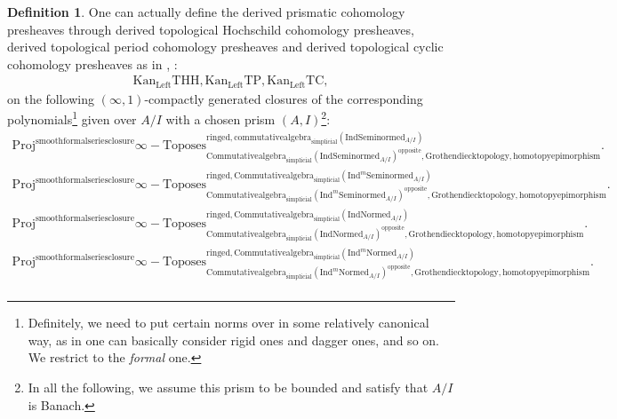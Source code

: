 \documentclass[11pt]{book}
\theoremstyle{definition}
\newtheorem{definition}[theorem]{Definition}
\numberwithin{equation}{section}
\begin{document}
\begin{definition}
\indent One can actually define the derived prismatic cohomology presheaves through derived topological Hochschild cohomology presheaves, derived topological period cohomology presheaves and derived topological cyclic cohomology presheaves as in \cite[Section 2.2, Section 2.3]{12BMS}, \cite[Theorem 1.13]{12BS}:
\begin{align}
	\mathrm{Kan}_{\mathrm{Left}}\mathrm{THH},\mathrm{Kan}_{\mathrm{Left}}\mathrm{TP},\mathrm{Kan}_{\mathrm{Left}}\mathrm{TC},
\end{align}
on the following $(\infty,1)$-compactly generated closures of the corresponding polynomials\footnote{Definitely, we need to put certain norms over in some relatively canonical way, as in \cite[Section 4.2]{BBM} one can basically consider rigid ones and dagger ones, and so on. We restrict to the \textit{formal} one.} given over $A/I$ with a chosen prism $(A,I)$\footnote{In all the following, we assume this prism to be bounded and satisfy that $A/I$ is Banach.}:
\begin{align}
\mathrm{Proj}^\text{smoothformalseriesclosure}\infty-\mathrm{Toposes}^{\mathrm{ringed},\mathrm{commutativealgebra}_{\mathrm{simplicial}}(\mathrm{Ind}\mathrm{Seminormed}_{A/I})}_{\mathrm{Commutativealgebra}_{\mathrm{simplicial}}(\mathrm{Ind}\mathrm{Seminormed}_{A/I})^\mathrm{opposite},\mathrm{Grothendiecktopology,homotopyepimorphism}}. \\
\mathrm{Proj}^\text{smoothformalseriesclosure}\infty-\mathrm{Toposes}^{\mathrm{ringed},\mathrm{Commutativealgebra}_{\mathrm{simplicial}}(\mathrm{Ind}^m\mathrm{Seminormed}_{A/I})}_{\mathrm{Commutativealgebra}_{\mathrm{simplicial}}(\mathrm{Ind}^m\mathrm{Seminormed}_{A/I})^\mathrm{opposite},\mathrm{Grothendiecktopology,homotopyepimorphism}}.\\
\mathrm{Proj}^\text{smoothformalseriesclosure}\infty-\mathrm{Toposes}^{\mathrm{ringed},\mathrm{Commutativealgebra}_{\mathrm{simplicial}}(\mathrm{Ind}\mathrm{Normed}_{A/I})}_{\mathrm{Commutativealgebra}_{\mathrm{simplicial}}(\mathrm{Ind}\mathrm{Normed}_{A/I})^\mathrm{opposite},\mathrm{Grothendiecktopology,homotopyepimorphism}}.\\
\mathrm{Proj}^\text{smoothformalseriesclosure}\infty-\mathrm{Toposes}^{\mathrm{ringed},\mathrm{Commutativealgebra}_{\mathrm{simplicial}}(\mathrm{Ind}^m\mathrm{Normed}_{A/I})}_{\mathrm{Commutativealgebra}_{\mathrm{simplicial}}(\mathrm{Ind}^m\mathrm{Normed}_{A/I})^\mathrm{opposite},\mathrm{Grothendiecktopology,homotopyepimorphism}}.\\

\end{align}
\end{definition}
\end{document}
